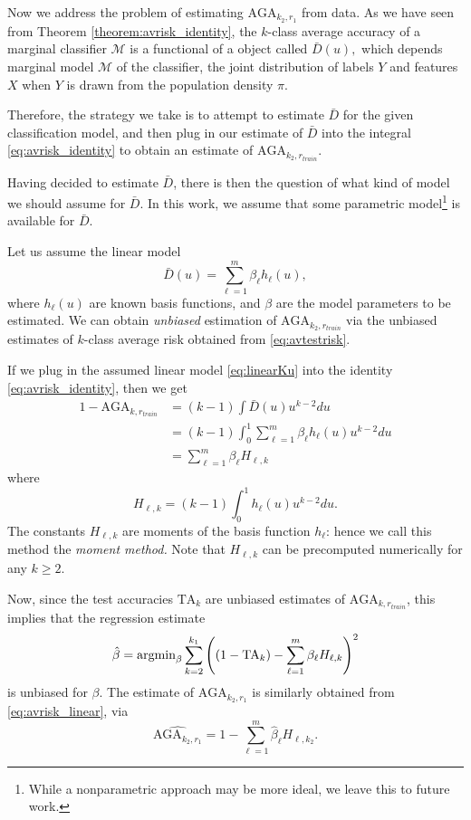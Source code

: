 \documentclass[12pt]{article}
\begin{document}
Now we address the problem of estimating $\text{AGA}_{k_2, r_1}$ from
data.  As we have seen from Theorem \ref{theorem:avrisk_identity}, the
$k$-class average accuracy of a marginal classifier $\mathcal{M}$ is a
functional of a object called $\bar{D}(u),$ which depends marginal
model $\mathcal{M}$ of the classifier, the joint distribution of
labels $Y$ and features $X$ when $Y$ is drawn from the population
density $\pi$.

Therefore, the strategy we take is to attempt to estimate $\bar{D}$
for the given classification model, and then plug in our estimate of
$\bar{D}$ into the integral \eqref{eq:avrisk_identity} to obtain an
estimate of $\text{AGA}_{k_2, r_{train}}$.

Having decided to estimate $\bar{D}$, there is then the question of
what kind of model we should assume for $\bar{D}$.  In this work, we
assume that some parametric model\footnote{While a
nonparametric approach may be more ideal, we leave this to future work.} is available for $\bar{D}$.

Let us assume the linear model
\begin{equation}\label{eq:linearKu}
\bar{D}(u) = \sum_{\ell = 1}^m \beta_\ell h_\ell(u),
\end{equation}
where $h_\ell(u)$ are known basis functions, and $\beta$ are the model
parameters to be estimated. We can obtain \emph{unbiased} estimation
of $\text{AGA}_{k_2, r_{train}}$ via the unbiased estimates of
$k$-class average risk obtained from \eqref{eq:avtestrisk}.

If we plug in the assumed linear model \eqref{eq:linearKu} into the
identity \eqref{eq:avrisk_identity}, then we get
\begin{align}
1 - \text{AGA}_{k, r_{train}} &= (k-1)\int \bar{D}(u) u^{k-2} du
\\&= (k-1)\int_0^1 \sum_{\ell = 1}^m \beta_\ell h_\ell(u) u^{k-2} du
\\&= \sum_{\ell = 1}^m \beta_\ell H_{\ell,k} \label{eq:avrisk_linear}
\end{align}
where
\begin{equation}
H_{\ell,k} = (k-1) \int_0^1 h_\ell(u) u^{k-2} du.
\end{equation}
The constants $H_{\ell, k}$ are moments of the basis function
$h_\ell$: hence we call this method the \emph{moment method.}  Note
that $H_{\ell, k}$ can be precomputed numerically for any $k \geq 2$.


Now, since the test accuracies $\text{TA}_k$ are unbiased estimates of
$\text{AGA}_{k, r_{train}}$, this implies that the regression
estimate
\[
\hat{\beta} = \text{argmin}_\beta \sum_{k=2}^{k_1} \left( (1 - \text{TA}_k) - \sum_{\ell=1}^m \beta_\ell H_{\ell, k}\right)^2
\]
is unbiased for $\beta$.
The estimate of $\text{AGA}_{k_2,r_1}$ is similarly obtained
from \eqref{eq:avrisk_linear}, via
\begin{equation}\label{eq:avrisk_hat}
\widehat{\text{AGA}_{k_2,r_1}} = 1 - \sum_{\ell=1}^m \hat{\beta}_\ell H_{\ell, k_2}.
\end{equation}
\end{document}
